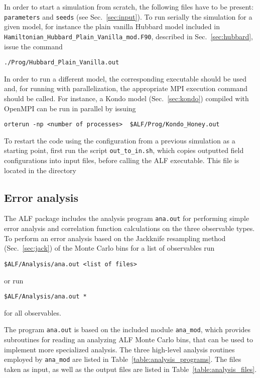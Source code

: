 In order to start a simulation from scratch, the following files have to be present: \texttt{parameters} and \texttt{seeds} (see Sec.~\ref{sec:input}). 
To run serially the simulation for a given model, for instance the plain vanilla Hubbard model included in \texttt{Hamiltonian\_Hubbard\_Plain\_Vanilla\_mod.F90}, described in Sec.~\ref{sec:hubbard}, issue the command
\begin{lstlisting}[style=bash]
./Prog/Hubbard_Plain_Vanilla.out
\end{lstlisting}
In order to run a different model, the corresponding executable should be used and, for running with parallelization, the appropriate MPI execution command should be called. For instance, a Kondo model (Sec.~\ref{sec:kondo}) compiled with OpenMPI can be run in parallel by issuing  
  \begin{lstlisting}[style=bash]
orterun -np <number of processes>  $ALF/Prog/Kondo_Honey.out
\end{lstlisting}


To restart the code using the configuration from a previous simulation as a starting point, first run the script \texttt{out\_to\_in.sh}, which copies outputted field configurations into input files, before calling the ALF executable.   This file is located in the  directory 

%
\subsection{Error analysis}\label{sec:analysis}
%

The ALF package includes the analysis program \texttt{ana.out} for performing simple error analysis and correlation function calculations on the three observable types. To perform an error analysis based on the Jackknife resampling method~\cite{efron1981} (Sec.~\ref{sec:jack}) of the Monte Carlo bins for a list of observables run
\begin{lstlisting}[style=bash]
$ALF/Analysis/ana.out <list of files>
\end{lstlisting}
or run
\begin{lstlisting}[style=bash]
$ALF/Analysis/ana.out *
\end{lstlisting}
for all observables.

The program \texttt{ana.out} is based on the included module \texttt{ana\_mod}, which provides subroutines for reading an analyzing ALF Monte Carlo bins, that can be used to implement more specialized analysis. The three high-level analysis routines employed by \texttt{ana\_mod} are listed in Table~\ref{table:analysis_programs}. The files taken as input, as well as the output files are listed in Table~\ref{table:analysis_files}.

